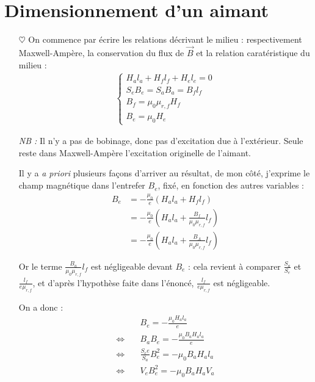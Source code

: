 \documentclass{report}
\begin{document}
\section*{Dimensionnement d'un aimant}

\begin{itemize}

	\item[$\heartsuit$] On commence par écrire les relations décrivant le milieu : respectivement Maxwell-Ampère, la conservation du flux de $\vec{B}$ et la relation caratéristique du milieu :
		\begin{align*}
		\begin{cases}
        	 H_al_a+H_fl_f+H_el_e=0 \\ 
			S_eB_e=S_aB_a=B_fl_f \\
			B_f = \mu_0\mu_{r,f}H_f\\
			B_e=\mu_0H_e
		\end{cases}  
		\end{align*}

\textit{NB : } Il n'y a pas de bobinage, donc pas d'excitation due à l'extérieur. Seule reste dans Maxwell-Ampère l'excitation originelle de l'aimant.

Il y a \textit{a priori} plusieurs façons d'arriver au résultat, de mon côté, j'exprime le champ magnétique dans l'entrefer $B_e$, fixé, en fonction des autres variables :
\begin{align}	
	B_e &=- \frac{\mu_0}{e}(H_al_a+H_fl_f)\\
	&=-\frac{\mu_0}{e}\left( H_al_a+\frac{B_f}{\mu_0\mu_{r,f}}l_f\right) \\
	&=-\frac{\mu_0}{e}\left( H_al_a+\frac{B_A}{\mu_0\mu_{r,f}}l_f\right) 
\end{align}

Or le terme $\frac{B_a}{\mu_0\mu_{r,f}}l_f$ est négligeable devant $B_e$ : cela revient à comparer $\frac{S_a}{S_e}$ et $\frac{l_f}{e\mu_{r,f}}$, et d'après l'hypothèse faite dans l'énoncé, $\frac{l_f}{e\mu_{r,f}}$ est négligeable.

On a donc : 
\begin{align*}
	& B_e =-\frac{\mu_0H_al_a}{e} \\
	\Leftrightarrow \quad & B_aB_e =-\frac{\mu_0B_aH_al_a}{e} \\
	\Leftrightarrow \quad & \frac{S_ee}{S_a}B_e^2 =-\mu_0B_aH_al_a \\
	\Leftrightarrow \quad & V_eB_e^2 =-\mu_0B_aH_aV_a \\
\end{align*}
	

\end{itemize}
\end{document}
